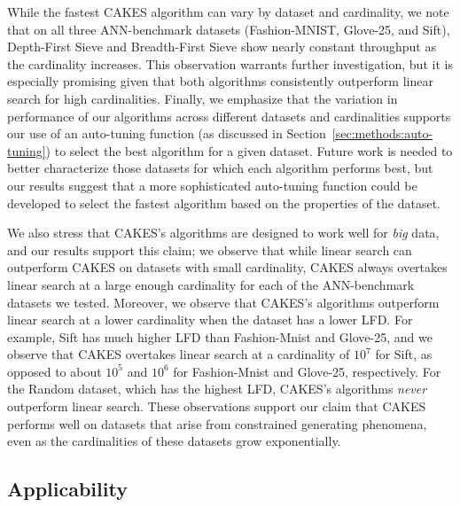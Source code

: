 While the fastest CAKES algorithm can vary by dataset and cardinality, we note that on all three ANN-benchmark datasets (Fashion-MNIST, Glove-25, and Sift), Depth-First Sieve and Breadth-First Sieve show nearly constant throughput as the cardinality increases.
This observation warrants further investigation, but it is especially promising given that both algorithms consistently outperform linear search for high cardinalities.
Finally, we emphasize that the variation in performance of our algorithms across different datasets and cardinalities supports our use of an auto-tuning function (as discussed in Section~\ref{sec:methods:auto-tuning}) to select the best algorithm for a given dataset.
Future work is needed to better characterize those datasets for which each algorithm performs best, but our results suggest that a more sophisticated auto-tuning function could be developed to select the fastest algorithm based on the properties of the dataset.

We also stress that CAKES's algorithms are designed to work well for \textit{big} data, and our results support this claim;
we observe that while linear search can outperform CAKES on datasets with small cardinality, CAKES always overtakes linear search at a large enough cardinality for each of the ANN-benchmark datasets we tested.
Moreover, we observe that CAKES's algorithms outperform linear search at a lower cardinality when the dataset has a lower LFD.
For example, Sift has much higher LFD than Fashion-Mnist and Glove-25, and we observe that CAKES overtakes linear search at a cardinality of $10^7$ for Sift, as opposed to about $10^5$ and $10^6$ for Fashion-Mnist and Glove-25, respectively.
For the Random dataset, which has the highest LFD, CAKES's algorithms \textit{never} outperform linear search.
These observations support our claim that CAKES performs well on datasets that arise from constrained generating phenomena, even as the cardinalities of these datasets grow exponentially.

\subsection{Applicability}

